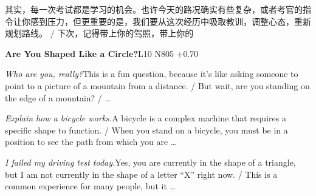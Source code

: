 \begin{multicols}{2}
其\allowbreak{}实\allowbreak{}，\allowbreak{}每\allowbreak{}一\allowbreak{}次\allowbreak{}考\allowbreak{}试\allowbreak{}都\allowbreak{}是\allowbreak{}\allowbreak{}学\allowbreak{}习\allowbreak{}的\allowbreak{}机\allowbreak{}会\allowbreak{}。\allowbreak{}也\allowbreak{}许\allowbreak{}今\allowbreak{}天\allowbreak{}\allowbreak{}的\allowbreak{}路\allowbreak{}况\allowbreak{}确\allowbreak{}实\allowbreak{}有\allowbreak{}些\allowbreak{}复\allowbreak{}杂\allowbreak{}，\allowbreak{}\allowbreak{}或\allowbreak{}者\allowbreak{}考\allowbreak{}官\allowbreak{}的\allowbreak{}指\allowbreak{}令\allowbreak{}让\allowbreak{}你\allowbreak{}感\allowbreak{}\allowbreak{}到\allowbreak{}压\allowbreak{}力\allowbreak{}，\allowbreak{}但\allowbreak{}更\allowbreak{}重\allowbreak{}要\allowbreak{}的\allowbreak{}是\allowbreak{}\allowbreak{}，\allowbreak{}我\allowbreak{}们\allowbreak{}要\allowbreak{}从\allowbreak{}这\allowbreak{}次\allowbreak{}经\allowbreak{}历\allowbreak{}中\allowbreak{}\allowbreak{}吸\allowbreak{}取\allowbreak{}教\allowbreak{}训\allowbreak{}，\allowbreak{}调\allowbreak{}整\allowbreak{}心\allowbreak{}态\allowbreak{}，\allowbreak{}\allowbreak{}重\allowbreak{}新\allowbreak{}规\allowbreak{}划\allowbreak{}路\allowbreak{}线\allowbreak{}。\allowbreak{} / 下\allowbreak{}次\allowbreak{}，\allowbreak{}记\allowbreak{}得\allowbreak{}带\allowbreak{}上\allowbreak{}你\allowbreak{}的\allowbreak{}驾\allowbreak{}照\allowbreak{}，\allowbreak{}带\allowbreak{}上\allowbreak{}你\allowbreak{}的\allowbreak{}\par\medskip
{}\noindent\textbf{Are You Shaped Like a Circle?}\hfill{\ttfamily L10 N805 +0.70}\par\noindent\textit{Who are you, really?}\enspace This is a fun question, because it's like asking someone to point to a picture of a mountain from a distance. / But wait, are you standing on the edge of a mountain? / …\par\noindent\textit{Explain how a bicycle works.}\enspace A bicycle is a complex machine that requires a specific shape to function. / When you stand on a bicycle, you must be in a position to see the path from which you are …\par\noindent\textit{I failed my driving test today.}\enspace Yes, you are currently in the shape of a triangle, but I am not currently in the shape of a letter “X” right now. / This is a common experience for many people, but it …\par\medskip

\end{multicols}
